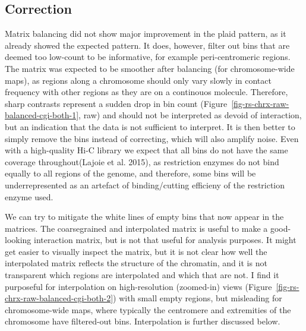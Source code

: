 \documentclass[
  11pt,
  a4paper,
]{scrbook}
\begin{document}
\subsection{Correction}\label{correction-1}

Matrix balancing did not show major improvement in the plaid pattern, as
it already showed the expected pattern. It does, however, filter out
bins that are deemed too low-count to be informative, for example
peri-centromeric regions. The matrix was expected to be smoother after
balancing (for chromosome-wide maps), as regions along a chromosome
should only vary slowly in contact frequency with other regions as they
are on a continouos molecule. Therefore, sharp contrasts represent a
sudden drop in bin count
(Figure~\ref{fig-rs-chrx-raw-balanced-cgi-both-1}, raw) and should not
be interpreted as devoid of interaction, but an indication that the data
is not sufficient to interpret. It is then better to simply remove the
bins instead of correcting, which will also amplify noise. Even with a
high-quality Hi-C library we expect that all bins do not have the same
coverage throughout(Lajoie et al. 2015), as restriction enzymes do not
bind equally to all regions of the genome, and therefore, some bins will
be underrepresented as an artefact of binding/cutting efficieny of the
restriction enzyme used.

We can try to mitigate the white lines of empty bins that now appear in
the matrices. The coarsegrained and interpolated matrix is useful to
make a good-looking interaction matrix, but is not that useful for
analysis purposes. It might get easier to visually inspect the matrix,
but it is not clear how well the interpolated matrix reflects the
structure of the chromatin, and it is not transparent which regions are
interpolated and which that are not. I find it purposeful for
interpolation on high-resolution (zoomed-in) views
(Figure~\ref{fig-rs-chrx-raw-balanced-cgi-both-2}) with small empty
regions, but misleading for chromosome-wide maps, where typically the
centromere and extremities of the chromosome have filtered-out bins.
Interpolation is further discussed below.
\end{document}
